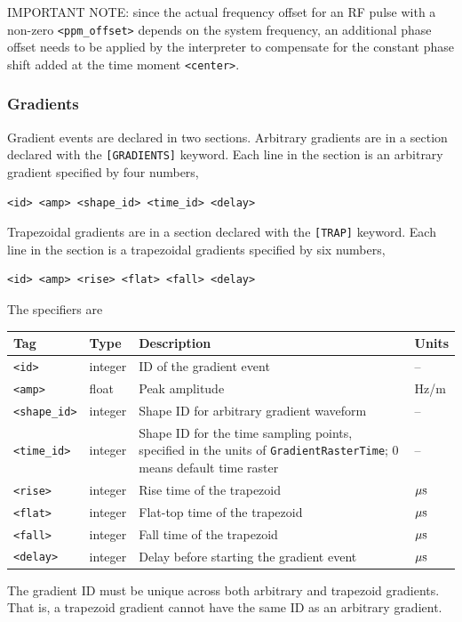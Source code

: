 \documentclass{article}
\begin{document}
IMPORTANT NOTE: since the actual frequency offset for an RF pulse with a non-zero \verb.<ppm_offset>. depends on the system frequency, an additional phase offset needs to be applied by the interpreter to compensate for the constant phase shift added at the time moment \verb.<center>..

\subsubsection{Gradients}
Gradient events are declared in two sections. Arbitrary gradients are in a section declared with the \verb.[GRADIENTS]. keyword. Each line in the section is an arbitrary gradient specified by four numbers,
\begin{lstlisting}
<id> <amp> <shape_id> <time_id> <delay>
\end{lstlisting}
Trapezoidal gradients are in a section declared with the \verb.[TRAP]. keyword. Each line in the section is a trapezoidal gradients specified by six numbers,
\begin{lstlisting}
<id> <amp> <rise> <flat> <fall> <delay>
\end{lstlisting}

The specifiers are

\begin{tabularx}{\textwidth}{llXl}
\toprule
Tag & Type & Description & Units\\
\midrule
\verb.<id>. & integer & ID of the gradient event & -- \\
\verb.<amp>. & float & Peak amplitude & Hz/m \\
\verb.<shape_id>. & integer & Shape ID for arbitrary gradient waveform & -- \\
\verb.<time_id>. & integer & Shape ID for the time sampling points, specified in the units of \verb.GradientRasterTime.; 0 means default time raster & -- \\
\verb.<rise>. & integer & Rise time of the trapezoid & $\rm \mu s$ \\
\verb.<flat>. & integer & Flat-top time of the trapezoid & $\rm \mu s$ \\
\verb.<fall>. & integer & Fall time of the trapezoid & $\rm \mu s$ \\
\verb.<delay>. & integer & Delay before starting the gradient event & $\rm \mu s$\\
\bottomrule
\end{tabularx}

The gradient ID must be unique across both arbitrary and trapezoid gradients. That is, a trapezoid gradient cannot have the same ID as an arbitrary gradient.
\end{document}
